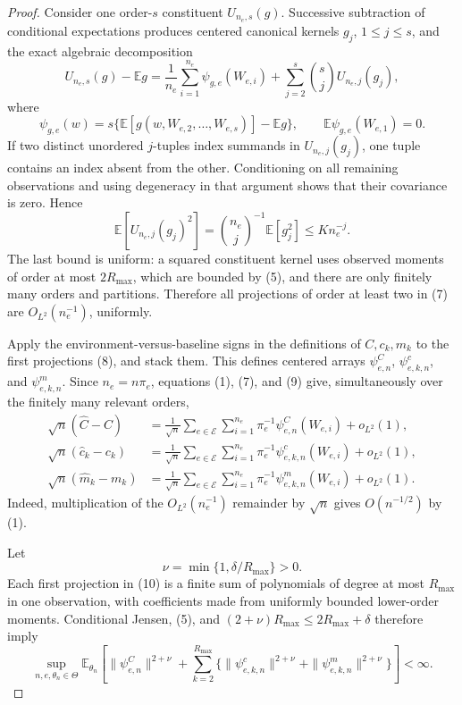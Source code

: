 \documentclass{article}
\begin{document}
\begin{proof}
Consider one order-\(s\) constituent \(U_{n_e,s}(g)\).  Successive subtraction of conditional expectations produces centered canonical kernels \(g_j\), \(1\leq j\leq s\), and the exact algebraic decomposition
\[
 U_{n_e,s}(g)-\mathbb Eg
 =\frac1{n_e}\sum_{i=1}^{n_e}\psi_{g,e}(W_{e,i})
  +\sum_{j=2}^s {s\choose j}U_{n_e,j}(g_j), \tag{7}
\]
where
\[
 \psi_{g,e}(w)
 =s\{\mathbb E[g(w,W_{e,2},\ldots,W_{e,s})]-\mathbb Eg\},
 \qquad \mathbb E\psi_{g,e}(W_{e,1})=0. \tag{8}
\]
If two distinct unordered \(j\)-tuples index summands in \(U_{n_e,j}(g_j)\), one tuple contains an index absent from the other.  Conditioning on all remaining observations and using degeneracy in that argument shows that their covariance is zero.  Hence
\[
 \mathbb E\!\left[U_{n_e,j}(g_j)^2\right]
 ={n_e\choose j}^{-1}\mathbb E[g_j^2]
 \leq K n_e^{-j}. \tag{9}
\]
The last bound is uniform: a squared constituent kernel uses observed moments of order at most \(2R_{\max}\), which are bounded by (5), and there are only finitely many orders and partitions.  Therefore all projections of order at least two in (7) are \(O_{L^2}(n_e^{-1})\), uniformly.

Apply the environment-versus-baseline signs in the definitions of \(C,c_k,m_k\) to the first projections (8), and stack them.  This defines centered arrays \(\psi^C_{e,n}\), \(\psi^c_{e,k,n}\), and \(\psi^m_{e,k,n}\).  Since \(n_e=n\pi_e\), equations (1), (7), and (9) give, simultaneously over the finitely many relevant orders,
\[
 \begin{aligned}
 \sqrt n(\widehat C-C)
 &=\frac1{\sqrt n}\sum_{e\in\mathcal E}\sum_{i=1}^{n_e}
      \pi_e^{-1}\psi^C_{e,n}(W_{e,i})+o_{L^2}(1),\\
 \sqrt n(\widehat c_k-c_k)
 &=\frac1{\sqrt n}\sum_{e\in\mathcal E}\sum_{i=1}^{n_e}
      \pi_e^{-1}\psi^c_{e,k,n}(W_{e,i})+o_{L^2}(1),\\
 \sqrt n(\widehat m_k-m_k)
 &=\frac1{\sqrt n}\sum_{e\in\mathcal E}\sum_{i=1}^{n_e}
      \pi_e^{-1}\psi^m_{e,k,n}(W_{e,i})+o_{L^2}(1).
 \end{aligned} \tag{10}
\]
Indeed, multiplication of the \(O_{L^2}(n_e^{-1})\) remainder by \(\sqrt n\) gives \(O(n^{-1/2})\) by (1).

Let
\[
 \nu=\min\{1,\delta/R_{\max}\}>0. \tag{11}
\]
Each first projection in (10) is a finite sum of polynomials of degree at most \(R_{\max}\) in one observation, with coefficients made from uniformly bounded lower-order moments.  Conditional Jensen, (5), and
\((2+\nu)R_{\max}\leq2R_{\max}+\delta\) therefore imply
\[
 \sup_{n,e,\theta_n\in\Theta}\mathbb E_{\theta_n}\!\left[
 \|\psi^C_{e,n}\|^{2+\nu}
 +\sum_{k=2}^{R_{\max}}
 \{\|\psi^c_{e,k,n}\|^{2+\nu}
   +\|\psi^m_{e,k,n}\|^{2+\nu}\}\right]<\infty. \tag{12}
\]


\end{proof}
\end{document}
